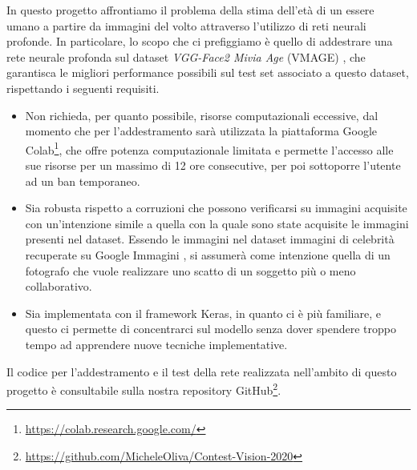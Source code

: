 In questo progetto affrontiamo il problema della stima dell'età di un essere umano a partire da immagini del volto attraverso l'utilizzo di reti neurali profonde. 
In particolare, lo scopo che ci prefiggiamo è quello di addestrare una rete neurale profonda sul dataset \emph{VGG-Face2 Mivia Age} (VMAGE) \cite{miviaage}, che garantisca le migliori performance possibili sul test set associato a questo dataset, rispettando i seguenti requisiti.

\begin{itemize}
	\item Non richieda, per quanto possibile, risorse computazionali eccessive, dal momento che per l'addestramento sarà utilizzata la piattaforma Google Colab\footnote{\url{https://colab.research.google.com/}}, che offre potenza computazionale limitata e permette l'accesso alle sue risorse per un massimo di 12 ore consecutive, per poi sottoporre l'utente ad un ban temporaneo.
	\item \label{sec:intro.intention}Sia robusta rispetto a corruzioni che possono verificarsi su immagini acquisite con un'intenzione simile a quella con la quale sono state acquisite le immagini presenti nel dataset.
Essendo le immagini nel dataset immagini di celebrità recuperate su Google Immagini \cite{vggface2dataset}, si assumerà come intenzione quella di un fotografo che vuole realizzare uno scatto di un soggetto più o meno collaborativo.
	\item Sia implementata con il framework Keras, in quanto ci è più familiare, e questo ci permette di concentrarci sul modello senza dover spendere troppo tempo ad apprendere nuove tecniche implementative.
\end{itemize}

Il codice per l’addestramento e il test della rete realizzata nell’ambito di questo progetto è consultabile sulla nostra repository GitHub\footnote{\url{https://github.com/MicheleOliva/Contest-Vision-2020}}.